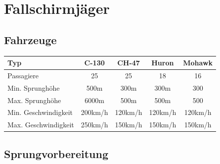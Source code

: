\newpage
\section{Fallschirmjäger}

\subsection{Fahrzeuge}
\begin{longtable}{|l|c|c|c|c|} \hline
	Typ & C-130 & CH-47 &	Huron	&	Mohawk \\ \hline
	Passagiere 	&	25 	&	25 	&	18 	&	16 \\ \hline
	Min. Sprunghöhe	& 500m 	& 300m 	&	300m	&	300	\\ \hline
	Max. Sprunghöhe	&	6000m 	&	500m 	&	500m	&	500 \\ \hline
	Min. Geschwindigkeit	& 	200km/h	&	120km/h	&	120km/h	&	120km/h	\\ \hline
	Max. Geschwindigkeit	& 	250km/h	&	150km/h &	150km/h &	150km/h \\ \hline
\end{longtable}

\subsection{Sprungvorbereitung}
